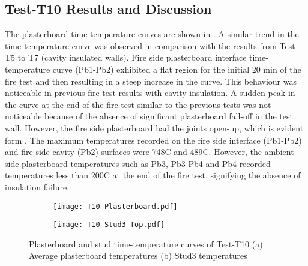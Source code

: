 \subsection{Test-T10 Results and Discussion}

The plasterboard time-temperature curves are shown in . A similar trend in the time-temperature curve was observed in comparison with the results from Test-T5 to T7 (cavity insulated walls). Fire side plasterboard interface time-temperature curve (Pb1-Pb2) exhibited a flat region for the initial 20 min of the fire test and then resulting in a steep increase in the curve. This behaviour was noticeable in previous fire test results with cavity insulation. A sudden peak in the curve at the end of the fire test similar to the previous tests was not noticeable because of the absence of significant plasterboard fall-off in the test wall. However, the fire side plasterboard had the joints open-up, which is evident form . The maximum temperatures recorded on the fire side interface (Pb1-Pb2) and fire side cavity (Pb2) surfaces were 748\degree C and 489\degree C. However, the ambient side plasterboard temperatures such as Pb3, Pb3-Pb4 and Pb4 recorded temperatures less than 200\degree C at the end of the fire test, signifying the absence of insulation failure.
\begin{figure}[!htbp]
	\centering
	\begin{subfigure}[b]{0.7\textwidth}
		\centering
		\texttt{[image: T10-Plasterboard.pdf]}
		\caption{}
		\label{subfig:T10-Plasterboard}
	\end{subfigure}
	\begin{subfigure}[b]{0.7\textwidth}
		\centering
		\texttt{[image: T10-Stud3-Top.pdf]}
		\caption{}
		\label{subfig:T10-Stud3-4-Top}
	\end{subfigure}
	   \caption{Plasterboard and stud time-temperature curves of Test-T10 (a) Average plasterboard temperatures (b) Stud3 temperatures}
	   \label{fig:T10-PB-Stud}
\end{figure}

